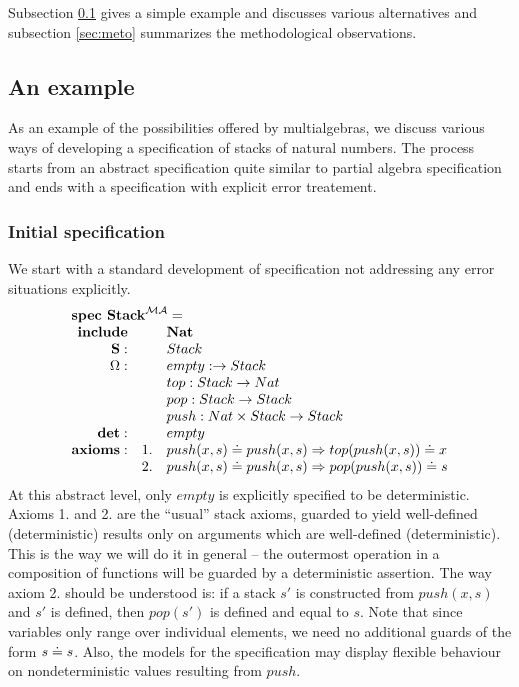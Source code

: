 \documentclass[10pt]{article}
\begin{document}
Subsection \ref{sub:ex} gives a simple example and discusses various
alternatives and subsection \ref{sec:meto} summarizes the methodological
observations.

\subsection{An example}\label{sub:ex}
As an example of the possibilities offered by multialgebras, we discuss
various ways of developing a specification of stacks of natural numbers. The
process starts from an abstract specification quite similar to partial
algebra specification and ends with a specification with explicit error treatement.

\subsubsection{Initial specification}\label{subsub:pa1}
We start with a standard development of specification not addressing any
error situations explicitly.
\[ \spec{
	\tit{\mbox{\bf spec\ Stack}^{\inst{MA}}=} \\
		{\bf include}
			&& {\bf Nat}\\
		\Sorts: && Stack\\
		\Ops:   && empty: \to Stack\\
			&& top:Stack \to Nat\\
			&& pop:Stack \to Stack\\
			&& push:Nat \times Stack \to Stack\\
		{\bf det:} && empty \\
		{\bf axioms:}			
			&1.& push(x,s) \eleq push(x,s) \To top(push(x,s)) \eleq x\\
			&2.& push(x,s) \eleq push(x,s) \To pop(push(x,s)) \eleq s
}
\]
At this abstract level, only $empty$ is explicitly specified to be
deterministic.  Axioms 1. and 2. are the ``usual'' stack axioms,
guarded to yield well-defined (deterministic) results only on
arguments which are well-defined (deterministic).
This is the way we will do it in general -- the outermost operation in a
composition of functions will be guarded by a deterministic assertion. The
way axiom 2. should be understood is: if a stack $s'$ is constructed from $push(x,s)$
and $s'$ is defined, then  $pop(s')$ is defined and equal to $s$.
Note that since variables only range over individual elements, we need no
additional guards of the form $s\mathrel{\dot{=} } s$. Also, 
the models for the specification may display flexible behaviour on nondeterministic values
resulting from $push$. 
\end{document}
